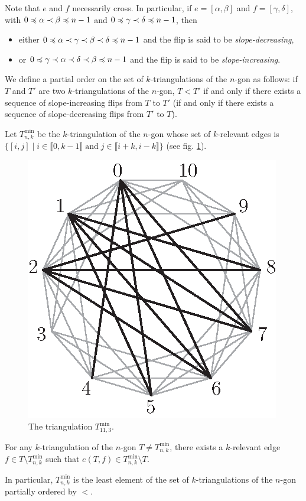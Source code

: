 \documentclass[12pt]{amsart}
\begin{document}
\medskip
Note that $e$ and $f$ necessarily cross.
In particular, if $e=[\alpha,\beta]$ and $f=[\gamma,\delta]$, with $0\preccurlyeq\alpha\prec\beta\preccurlyeq n-1$ and $0\preccurlyeq\gamma\prec\delta\preccurlyeq n-1$, then
\begin{itemize}
\item either $0\preccurlyeq\alpha\prec\gamma\prec\beta\prec\delta\preccurlyeq n-1$ and the flip is said to be \emph{slope-decreasing},
\item or $0\preccurlyeq\gamma\prec\alpha\prec\delta\prec\beta\preccurlyeq n-1$ and the flip is said to be \emph{slope-increasing}.
\end{itemize}
We define a partial order on the set of $k$-triangulations of the $n$-gon as follows: if $T$ and $T'$ are two $k$-triangulations of the $n$-gon, $T<T'$ if and only if there exists a sequence of slope-increasing flips from $T$ to $T'$ (if and only if there exists a sequence of slope-decreasing flips from $T'$ to $T$).

Let $T_{n,k}^{\min}$ be the $k$-triangulation of the $n$-gon whose set of $k$-relevant edges is $\{[i,j]\;|\;i\in\llbracket 0,k-1\rrbracket\;\mathrm{and}\;j\in\llbracket i+k,i-k\rrbracket\}$ (see fig. \ref{min}).

\begin{figure}
\centerline{\includegraphics[scale=1]{min.eps}}
\caption{\small{The triangulation $T_{11,3}^{\min}$.}}\label{min}
\end{figure}

\begin{lemma}\label{connexity}
For any $k$-triangulation of the $n$-gon $T\ne T_{n,k}^{\min}$, there exists a $k$-relevant edge $f\in T\setminus T_{n,k}^{\min}$ such that $e(T,f)\in T_{n,k}^{\min}\setminus T$.

In particular, $T_{n,k}^{\min}$ is the least element of the set of $k$-triangulations of the $n$-gon partially ordered by $<$.
\end{lemma}
\end{document}
